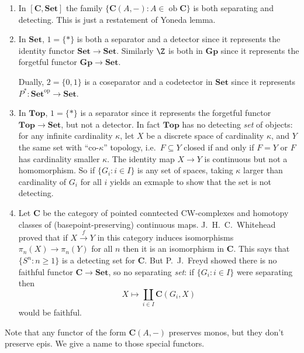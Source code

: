 \documentclass[a4paper]{article}
\renewcommand{\c}[1]{\mathbf{#1}}
\DeclareMathOperator{\ob}{ob}
\newcommand{\Set}{{\c{Set}}}
\newcommand{\Top}{{\c{Top}}}
\begin{document}
\begin{eg}\leavevmode
  \begin{enumerate}
  \item In \([\c C, \Set]\) the family \(\{\c C(A, -): A \in \ob \c C\}\) is both separating and detecting. This is just a restatement of Yoneda lemma.
  \item In \(\Set\), \(1 = \{*\}\) is both a separator and a detector since it represents the identity functor \(\Set \to \Set\). Similarly \(\Z\) is both in \(\c{Gp}\) since it represents the forgetful functor \(\c{Gp} \to \Set\).

    Dually, \(2 = \{0, 1\}\) is a coseparator and a codetector in \(\Set\) since it represents \(P^*: \Set^{\text{op}} \to \Set\).
  \item In \(\Top\), \(1 = \{*\}\) is a separator since it represents the forgetful functor \(\Top \to \Set\), but not a detector. In fact \(\Top\) has no detecting \emph{set} of objects: for any infinite cardinality \(\kappa\), let \(X\) be a discrete space of cardinality \(\kappa\), and \(Y\) the same set with ``co-\(\kappa\)'' topology, i.e.\ \(F \subseteq Y\) closed if and only if \(F = Y\) or \(F\) has cardinality smaller \(\kappa\). The identity map \(X \to Y\) is continuous but not a homomorphism. So if \(\{G_i: i \in I\}\) is any set of spaces, taking \(\kappa\) larger than cardinality of \(G_i\) for all \(i\) yields an exmaple to show that the set is not detecting.
  \item Let \(\c C\) be the category of pointed conntected CW-complexes and homotopy classes of (basepoint-preserving) continuous maps. J.\ H.\ C.\ Whitehead proved that if \(X \xrightarrow{f} Y\) in this category induces isomorphisms \(\pi_n(X) \to \pi_n(Y)\) for all \(n\) then it is an isomorphism in \(\c C\). This says that \(\{S^n: n \geq 1\}\) is a detecting set for \(\c C\). But P.\ J.\ Freyd showed there is no faithful functor \(\c C \to \Set\), so no separating \emph{set}: if \(\{G_i: i \in I\}\) were separating then
    \[
      X \mapsto \coprod_{i \in I} \c C(G_i, X)
    \]
    would be faithful.
  \end{enumerate}
\end{eg}

Note that any functor of the form \(\c C(A, -)\) preserves monos, but they don't preserve epis. We give a name to those special functors.
\end{document}
